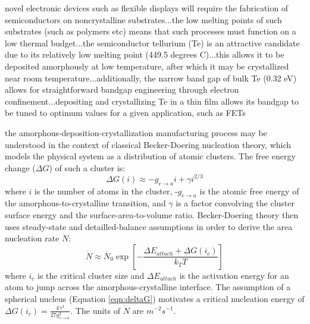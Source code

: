 novel electronic devices such as flexible displays will require the fabrication of semiconductors on noncrystalline substrates...the low melting points of such substrates (such as polymers etc) means that such processes must function on a low thermal budget...the semiconductor tellurium (Te) is an attractive candidate due to its relatively low melting point (449.5 degrees C)...this allows it to be deposited amorphously at low temperature, after which it may be crystallized near room temperature...additionally, the narrow band gap of bulk Te (0.32 eV) allows for straightforward bandgap engineering through electron confinement...depositing and crystallizing Te in a thin film allows its bandgap to be tuned to optimum values for a given application, such as FETs

the amorphous-deposition-crystallization manufacturing process may be understood in the context of classical Becker-Doering nucleation theory, which models the physical system as a distribution of atomic clusters.  The free energy change ($\Delta G$) of such a cluster is:
%
	\begin{equation}
		\Delta G(i) \approx -g_{c \rightarrow a}i + \gamma i^{2/3}
	\label{eqn:deltaG}
	\end{equation}
%
where $i$ is the number of atoms in the cluster, -$g_{c \rightarrow a}$ is the atomic free energy of the amorphous-to-crystalline transition, and $\gamma$ is a factor convolving the cluster surface energy and the surface-area-to-volume ratio.  Becker-Doering theory then uses steady-state and detailled-balance assumptions in order to derive the area nucleation rate $\dot{N}$:
%
	\begin{equation}
		\dot{N} \approx \dot{N_0} 
		\exp\left[-\frac{\Delta E_{attach} + \Delta G(i_c)}{k_T T}\right]
	\label{eqn:N_dot}
	\end{equation}
%
where $i_c$ is the critical cluster size and $\Delta E_{attach}$ is the activation energy for an atom to jump across the amorphous-crystalline interface.  The assumption of a spherical nucleus (Equation \ref{eqn:deltaG}) motivates a critical nucleation energy of $\Delta G(i_c) = \frac{4 \gamma^3}{27g_{c \rightarrow a}^2}$.  The units of $\dot{N}$ are $m^{-2}s^{-1}$.

